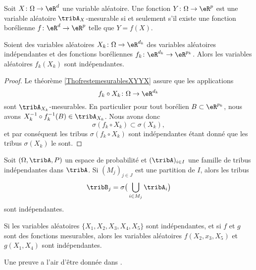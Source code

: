\begin{theorem}     \label{ThofrestemesurablesXYYX}
    Soit \( X\colon \Omega\to \eR^d\) une variable aléatoire. Une fonction \( Y\colon
    \Omega\to \eR^{p}\) est une variable aléatoire \( \tribA_X\)-mesurable si et seulement
    s'il existe une fonction borélienne \( f\colon \eR^d\to \eR^{p}\) telle que \( Y=f(X)\).
\end{theorem}

\begin{proposition}
    Soient des variables aléatoires \( X_k\colon \Omega\to \eR^{d_k}\) des variables aléatoires indépendantes et des fonctions boréliennes \( f_k\colon \eR^{d_k}\to \eR^{p_k}\). Alors les variables aléatoires \( f_k(X_k)\) sont indépendantes.
\end{proposition}

\begin{proof}
    Le théorème \ref{ThofrestemesurablesXYYX} assure que les applications
    \begin{equation}
        f_k\circ X_k\colon \Omega\to \eR^{d_k}
    \end{equation}
    sont \( \tribA_{X_k}\)-mesurables. En particulier pour tout borélien \( B\subset\eR^{p_k}\), nous avons \( X^{-1}_k\circ f^{-1}_k(B)\in\tribA_{X_k}\). Nous avons donc
    \begin{equation}
        \sigma(f_k\circ X_k)\subset\sigma(X_k),
    \end{equation}
    et par conséquent les tribus \( \sigma(f_k\circ X_k)\) sont indépendantes étant donné que les tribus \( \sigma(X_k)\) le sont.
\end{proof}

\begin{lemma}  \label{LemHOjqqw}
    Soit \( (\Omega,\tribA,P)\) un espace de probabilité et \( (\tribA)_{i\in I}\) une famille de tribus indépendantes dans \( \tribA\). Si \( (M_j)_{j\in J}\) est une partition de \( I\), alors les tribus
    \begin{equation}
        \tribB_j=\sigma\big( \bigcup_{i\in M_j}\tribA_i \big)
    \end{equation}
    sont indépendantes.

    Si les variables aléatoires \( \{ X_1,X_2,X_3,X_4,X_5 \}\) sont indépendantes, et si \( f\) et \( g\) sont des fonctions mesurables, alors les variables aléatoires \( f(X_2,x_3,X_5)\) et \( g(X_1,X_4)\) sont indépendantes.
\end{lemma}
Une preuve a l'air d'être donnée dans \cite{VincentBa}.


